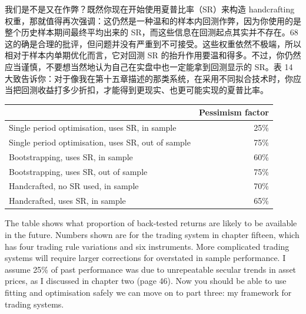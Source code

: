 \begin{chineseblock}我们是不是又在作弊？既然你现在开始使用夏普比率（SR）来构造 handcrafting 权重，那就值得再次强调：这仍然是一种温和的样本内回测作弊，因为你使用的是整个历史样本期间最终平均出来的 SR，而这些信息在回测起点其实并不存在。68这的确是合理的批评，但问题并没有严重到不可接受。这些权重依然不极端，所以相对于样本内单期优化而言，它对回测 SR 的抬升作用要温和得多。不过，你仍然应当谨慎，不要想当然地认为自己在实盘中也一定能拿到回测显示的 SR。表 14 大致告诉你：对于像我在第十五章描述的那类系统，在采用不同拟合技术时，你应当把回测收益打多少折扣，才能得到更现实、也更可能实现的夏普比率。\end{chineseblock}

\begin{chinesetableblock} \begingroup \small \centering \begin{tabular}{@{} lr@{}}
\toprule
& Pessimism factor \\
\midrule
Single period optimisation, uses SR, in sample & 25\% \\
Single period optimisation, uses SR, out of sample & 75\% \\
Bootstrapping, uses SR, in sample & 60\% \\
Bootstrapping, uses SR, out of sample & 75\% \\
Handcrafted, no SR used, in sample & 70\% \\
Handcrafted, uses SR, in sample & 65\% \\
\bottomrule
\end{tabular}
\par \endgroup \end{chinesetableblock}

\begin{englishblock} The table shows what proportion of back-tested returns are likely to be available in the future. Numbers shown are for the trading system in chapter fifteen, which has four trading rule variations and six instruments. More complicated trading systems will require larger corrections for overstated in sample performance. I assume 25\% of past performance was due to unrepeatable secular trends in asset prices, as I discussed in chapter two (page 46). Now you should be able to use fitting and optimisation safely we can move on to part three: my framework for trading systems. \end{englishblock}

